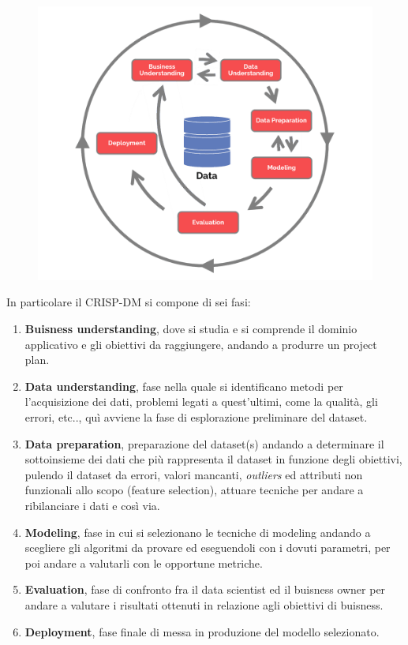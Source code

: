 \documentclass[italian,12pt,a4paper]{article}
\begin{document}
	\begin{figure}[h]
		\centering
		\includegraphics[scale=0.3]{CRISP-DM}
	\end{figure}

	In particolare il CRISP-DM si compone di sei fasi:
	
	\begin{enumerate}
		\item \textbf{Buisness understanding}, dove si studia e si comprende il dominio applicativo e gli obiettivi da raggiungere, andando a produrre un project plan.
		\item \textbf{Data understanding}, fase nella quale si identificano metodi per l'acquisizione dei dati, problemi legati a quest'ultimi, come la qualità, gli errori, etc.., quì avviene la fase di esplorazione preliminare del dataset.
		\item \textbf{Data preparation}, preparazione del dataset(s) andando a determinare il sottoinsieme dei dati che più rappresenta il dataset in funzione degli obiettivi, pulendo il dataset da errori, valori mancanti, \textit{outliers} ed attributi non funzionali allo scopo (feature selection), attuare tecniche per andare a ribilanciare i dati e così via.
		\item \textbf{Modeling}, fase in cui si selezionano le tecniche di modeling andando a scegliere gli algoritmi da provare ed eseguendoli con i dovuti parametri, per poi andare a valutarli con le opportune metriche.
		\item \textbf{Evaluation}, fase di confronto fra il data scientist ed il buisness owner per andare a valutare i risultati ottenuti in relazione agli obiettivi di buisness.
		\item \textbf{Deployment}, fase finale di messa in produzione del modello selezionato.
	\end{enumerate}
\end{document}
